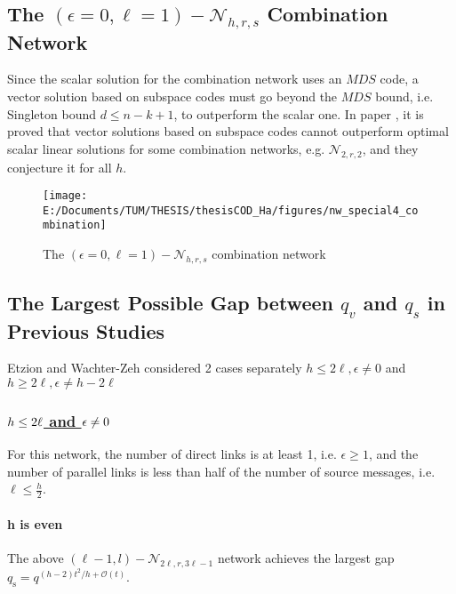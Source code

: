 \subsection{The $\left(\epsilon=0,\ell=1\right)-\mathcal{N}_{h,r,s}$ Combination
Network}

Since the scalar solution for the combination network uses an $MDS$
code, a vector solution based on subspace codes must go beyond the
$MDS$ bound, i.e. Singleton bound $d\leq n-k+1$, to outperform the
scalar one. In paper \cite[Sec. IV-A, Sec. IX-1,2]{Wachter-Zeh:2018},
it is proved that vector solutions based on subspace codes cannot
outperform optimal scalar linear solutions for some combination networks,
e.g. $\mathcal{N}_{2,r,2}$, and they conjecture it for all $h$. 

\begin{figure}[H]
\caption{The $\left(\epsilon=0,\ell=1\right)-\mathcal{N}_{h,r,s}$ combination
network \label{fig:network_special4}}

\centering{}\texttt{[image: E:/Documents/TUM/THESIS/thesisCOD\_Ha/figures/nw\_special4\_combination]}
\end{figure}


\subsection{The Largest Possible Gap between $q_{v}$ and $q_{s}$ in Previous
Studies}

Etzion and Wachter-Zeh considered 2 cases separately $h\leq2\ell,\epsilon\neq0$
and $h\geq2\ell,\epsilon\neq h-2\ell$

\subsubsection{\uline{\mbox{$h\protect\leq2\ell$} and \mbox{$\epsilon\protect\neq0$}}}

For this network, the number of direct links is at least 1, i.e. $\epsilon\geq1$,
and the number of parallel links is less than half of the number of
source messages, i.e. $\ell\leq\frac{h}{2}$.

\paragraph{h is even}

The above $\left(\ell-1,l\right)-\mathcal{N}_{2\ell,r,3\ell-1}$ network
achieves the largest gap $q_{\mathrm{s}}=q^{(h-2)t^{2}/h+\mathcal{O}(t)}$.


